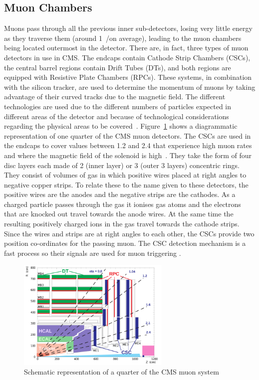 \subsection{Muon Chambers}
\label{ss:Muon_Chambers}
Muons pass through all the previous inner sub-detectors, losing very little energy as they traverse them
(around 1~\MeV/\mm on average), leading to the muon chambers being located outermost in the detector. There
are, in fact, three types of muon detectors in use in CMS. The endcaps contain Cathode Strip Chambers (CSCs),
the central barrel regions contain Drift Tubes (DTs), and both regions are equipped with Resistive Plate
Chambers (RPCs). These systems, in combination with the silicon tracker, are used to determine the momentum of
muons by taking advantage of their curved tracks due to the magnetic field. The different technologies are
used due to the different numbers of particles expected in different areas of the detector and because of
technological considerations regarding the physical areas to be covered~\cite{CMS_TDR1}.
Figure~\ref{fig:CMS_muon_system} shows a diagrammatic representation of one quarter of the CMS muon detectors.
The CSCs are used in the endcaps to cover \abseta values between 1.2 and 2.4 that experience high muon rates
and where the magnetic field of the solenoid is high~\cite{CMS_TDR1}. They take the form of four disc layers
each made of 2 (inner layer) or 3 (outer 3 layers) concentric rings. They consist of volumes of gas in which
positive wires placed at right angles to negative copper strips. To relate these to the name given to these
detectors, the positive wires are the anodes and the negative strips are the cathodes. As a charged particle
passes through the gas it ionises gas atoms and the electrons that are knocked out travel towards the anode
wires. At the same time the resulting positively charged ions in the gas travel towards the cathode strips.
Since the wires and strips are at right angles to each other, the CSCs provide two position co-ordinates for
the passing muon. The CSC detection mechanism is a fast process so their signals are used for muon triggering
\cite{CMS_experiment}.
 
\begin{figure}[hbtp]
   \centering
     \includegraphics[width=0.65\textwidth]{Chapters/02_Detector/Images/MuonSys-mod3.png}\hfill
     \caption[Schematic representation of a quarter of the CMS muon system.]{Schematic representation of a
     quarter of the CMS muon system \cite{Muon_tracking}}
     \label{fig:CMS_muon_system}
\end{figure}


